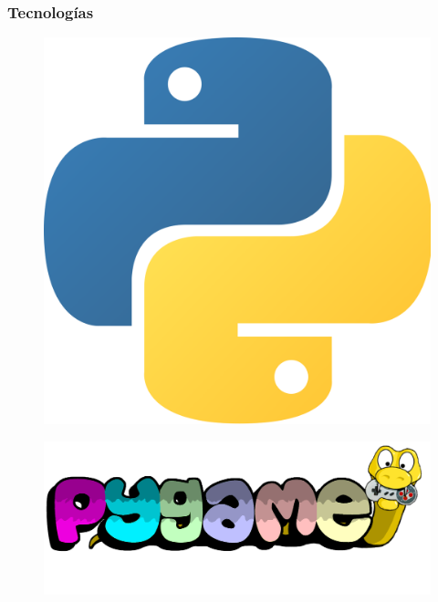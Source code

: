 \begin{frame}
\frametitle{Tecnologías}
\pause
\begin{figure}
\centering
\includegraphics[scale=0.03]{./images/python.png}
\end{figure}

\pause

\begin{center}
\arrowdown 
\end{center}

\begin{figure}
\centering

\includegraphics[scale=0.05]{./images/pygame.png}
\end{figure}

\pause

\begin{columns}


\end{columns}
\end{frame}
